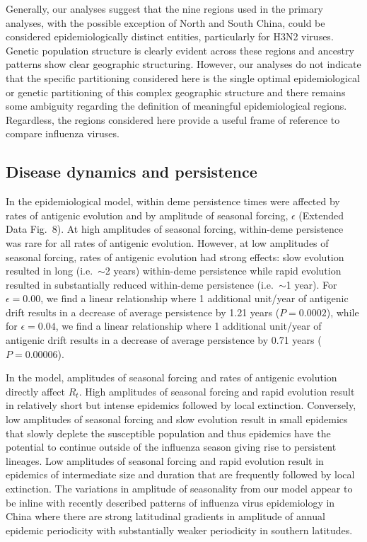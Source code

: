\documentclass[11pt,oneside,letterpaper]{article}
\begin{document}
Generally, our analyses suggest that the nine regions used in the primary analyses, with the possible exception of North and South China, could be considered epidemiologically distinct entities, particularly for H3N2 viruses.
Genetic population structure is clearly evident across these regions and ancestry patterns show clear geographic structuring.
However, our analyses do not indicate that the specific partitioning considered here is the single optimal epidemiological or genetic partitioning of this complex geographic structure and there remains some ambiguity regarding the definition of meaningful epidemiological regions.  
Regardless, the regions considered here provide a useful frame of reference to compare influenza viruses.

\subsection*{Disease dynamics and persistence}

In the epidemiological model, within deme persistence times were affected by rates of antigenic evolution and by amplitude of seasonal forcing, $\epsilon$ (Extended Data Fig.~8).
At high amplitudes of seasonal forcing, within-deme persistence was rare for all rates of antigenic evolution.
However, at low amplitudes of seasonal forcing, rates of antigenic evolution had strong effects: slow evolution resulted in long (i.e.\ $\sim$2 years) within-deme persistence while rapid evolution resulted in substantially reduced within-deme persistence (i.e.\ $\sim$1 year).
For $\epsilon = 0.00$, we find a linear relationship where 1 additional unit/year of antigenic drift results in a decrease of average persistence by 1.21 years ($P = 0.0002$), while for $\epsilon = 0.04$, we find a linear relationship where 1 additional unit/year of antigenic drift results in a decrease of average persistence by 0.71 years ($P = 0.00006$).

In the model, amplitudes of seasonal forcing and rates of antigenic evolution directly affect $R_{t}$.
High amplitudes of seasonal forcing and rapid evolution result in relatively short but intense epidemics followed by local extinction.
Conversely, low amplitudes of seasonal forcing and slow evolution result in small epidemics that slowly deplete the susceptible population and thus epidemics have the potential to continue outside of the influenza season giving rise to persistent lineages.
Low amplitudes of seasonal forcing and rapid evolution result in epidemics of intermediate size and duration that are frequently followed by local extinction.
The variations in amplitude of seasonality from our model appear to be inline with recently described patterns of influenza virus epidemiology in China \cite{Yu13} where there are strong latitudinal gradients in amplitude of annual epidemic periodicity with substantially weaker periodicity in southern latitudes.
\end{document}
